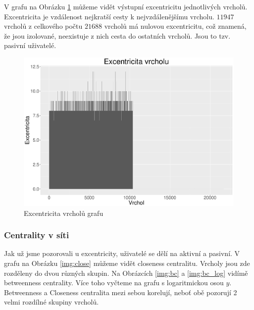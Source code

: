 \documentclass[a4paper,12pt]{article}
\begin{document}
V grafu na Obrázku \ref{img:eccen} můžeme vidět výstupní excentricitu jednotlivých vrcholů. Excentricita je 
vzdálenost nejkratší cesty k nejvzdálenějšímu vrcholu. $11947$ vrcholů z celkového počtu $21688$ 
vrcholů má nulovou excentricitu, což znamená, že jsou izolované, neexistuje z nich cesta do ostatních
vrcholů. Jsou to tzv. pasivní uživatelé.


\begin{figure}[h!]
\centering
\includegraphics[scale=0.4]{images/eccen.pdf}
\caption{Excentricita vrcholů grafu}
\label{img:eccen}
\end{figure}

\FloatBarrier
\subsubsection{Centrality v síti}

Jak už jsme pozorovali u excentricity, uživatelé se dělí na aktivní a pasivní. V grafu na Obrázku
\ref{img:close} můžeme vidět closeness centralitu. Vrcholy jsou zde rozděleny do dvou různých skupin.
Na Obrázcích \ref{img:bc} a \ref{img:bc_log} vidímě betweenness centrality. Více toho vyčteme na grafu
s logaritmickou osou $y$. Betweenness a Closeness centralita mezi sebou korelují, neboť obě pozorují 
2 velmi rozdílné skupiny vrcholů.
\end{document}
